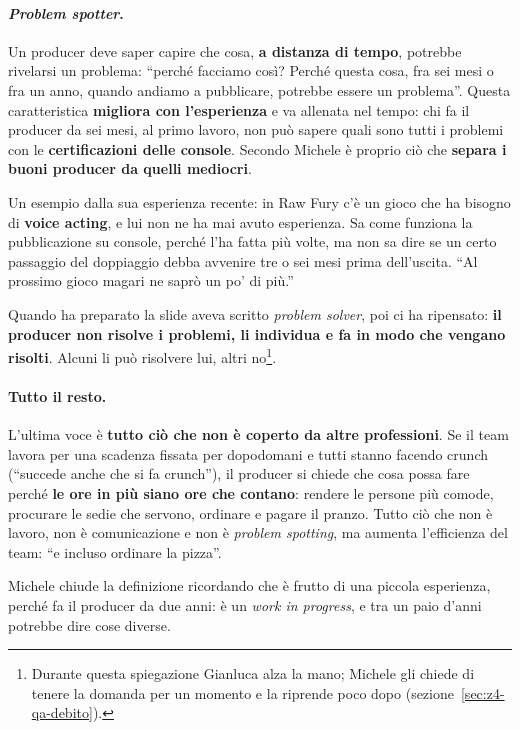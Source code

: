 \paragraph{\emph{Problem spotter}.} Un producer deve saper capire che cosa,
\textbf{a distanza di tempo}, potrebbe rivelarsi un problema: ``perché facciamo
così? Perché questa cosa, fra sei mesi o fra un anno, quando andiamo a
pubblicare, potrebbe essere un problema''. Questa caratteristica
\textbf{migliora con l'esperienza} e va allenata nel tempo: chi fa il producer
da sei mesi, al primo lavoro, non può sapere quali sono tutti i problemi con le
\textbf{certificazioni delle console}. Secondo Michele è proprio ciò che
\textbf{separa i buoni producer da quelli mediocri}.

Un esempio dalla sua esperienza recente: in Raw Fury c'è un gioco che ha
bisogno di \textbf{voice acting}, e lui non ne ha mai avuto esperienza. Sa come
funziona la pubblicazione su console, perché l'ha fatta più volte, ma non sa
dire se un certo passaggio del doppiaggio debba avvenire tre o sei mesi prima
dell'uscita. ``Al prossimo gioco magari ne saprò un po' di più.''

Quando ha preparato la slide aveva scritto \emph{problem solver}, poi ci ha
ripensato: \textbf{il producer non risolve i problemi, li individua e fa in
modo che vengano risolti}. Alcuni li può risolvere lui, altri
no\footnote{Durante questa spiegazione Gianluca alza la mano; Michele gli
chiede di tenere la domanda per un momento e la riprende poco dopo
(sezione~\ref{sec:z4-qa-debito}).}.

\paragraph{Tutto il resto.} L'ultima voce è \textbf{tutto ciò che non è coperto
da altre professioni}. Se il team lavora per una scadenza fissata per
dopodomani e tutti stanno facendo crunch (``succede anche che si fa crunch''),
il producer si chiede che cosa possa fare perché \textbf{le ore in più siano
ore che contano}: rendere le persone più comode, procurare le sedie che
servono, ordinare e pagare il pranzo. Tutto ciò che non è lavoro, non è
comunicazione e non è \emph{problem spotting}, ma aumenta l'efficienza del
team: ``e incluso ordinare la pizza''.

Michele chiude la definizione ricordando che è frutto di una piccola
esperienza, perché fa il producer da due anni: è un \emph{work in progress}, e
tra un paio d'anni potrebbe dire cose diverse.

